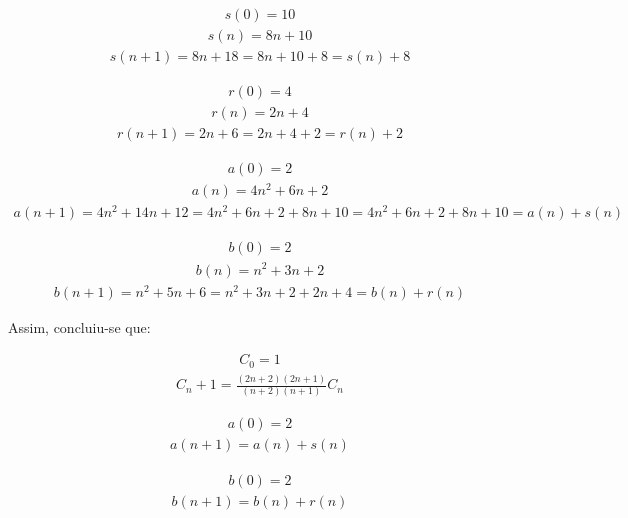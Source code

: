 \documentclass[a4paper]{article}
\begin{document}
\begin{eqnarray}
  s(0) = 10
\end{eqnarray}
\begin{eqnarray}
  s(n) = 8n + 10
\end{eqnarray}
\begin{eqnarray}
  s(n+1) = 8n + 18 = 8n + 10 + 8 = s(n) + 8
\end{eqnarray}

\begin{eqnarray}
  r(0) = 4
\end{eqnarray}
\begin{eqnarray}
  r(n) = 2n + 4
\end{eqnarray}
\begin{eqnarray}
  r(n+1) = 2n + 6 = 2n + 4 + 2 = r(n) + 2
\end{eqnarray}

\begin{eqnarray}
  a(0) = 2
\end{eqnarray}
\begin{eqnarray}
  a(n) = 4n^2 + 6n + 2
\end{eqnarray}
\begin{eqnarray}
  a(n+1) = 4n^2 + 14n + 12 = 4n^2 + 6n + 2 + 8n + 10 = 4n^2 + 6n + 2 + 8n + 10 = a(n) + s(n)
\end{eqnarray}

\begin{eqnarray}
  b(0) = 2
\end{eqnarray}
\begin{eqnarray}
  b(n) = n^2 + 3n + 2 
\end{eqnarray}
\begin{eqnarray}
  b(n+1) = n^2 + 5n + 6 = n^2 + 3n + 2 + 2n + 4 = b(n) + r(n)
\end{eqnarray}

Assim, concluiu-se que:

\begin{eqnarray}
  C_0 = 1
\end{eqnarray}
\begin{eqnarray}
  C_n+1 = \frac{(2n+2) (2n+1)}{(n+2) (n+1) } C_n
\end{eqnarray}

\begin{eqnarray}
  a(0) = 2
\end{eqnarray}
\begin{eqnarray}
  a(n+1) = a(n) + s(n)
\end{eqnarray}

\begin{eqnarray}
  b(0) = 2
\end{eqnarray}
\begin{eqnarray}
  b(n+1) = b(n) + r(n)
\end{eqnarray}
\end{document}
